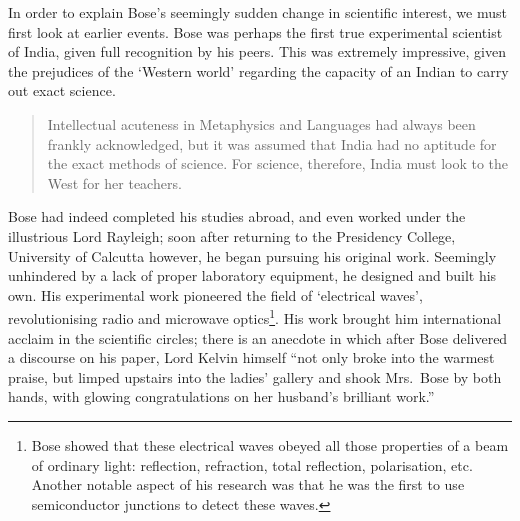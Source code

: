 \documentclass[11pt]{article}
\theoremstyle{remark}
\begin{document}
    In order to explain Bose's seemingly sudden change in scientific interest, we
    must first look at earlier events. Bose was perhaps the first true experimental
    scientist of India, given full recognition by his peers. This was extremely
    impressive, given the prejudices of the `Western world' regarding the capacity of
    an Indian to carry out exact science. 
    \begin{quote}
        Intellectual acuteness in Metaphysics and Languages had always been frankly
        acknowledged, but it was assumed that India had no aptitude for the exact
        methods of science. For science, therefore, India must look to the West for
        her teachers.
    \end{quote}
    Bose had indeed completed his studies abroad, and even worked under the
    illustrious Lord Rayleigh; soon after returning to the Presidency College,
    University of Calcutta however, he began pursuing his original work. Seemingly
    unhindered by a lack of proper laboratory equipment, he designed and built his
    own. His experimental work pioneered the field of `electrical waves',
    revolutionising radio and microwave optics\footnote{Bose showed that these
    electrical waves obeyed all those properties of a beam of ordinary light:
    reflection, refraction, total reflection, polarisation, etc. Another notable
    aspect of his research was that he was the first to use semiconductor junctions
    to detect these waves.}. His work brought him international acclaim in the
    scientific circles; there is an anecdote in which after Bose delivered a
    discourse on his paper, Lord Kelvin himself ``not only broke into the warmest
    praise, but limped upstairs into the ladies' gallery and shook Mrs.\ Bose by both
    hands, with glowing congratulations on her husband's brilliant work.''
\end{document}
